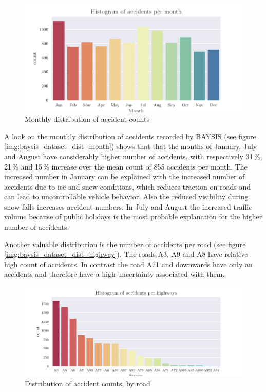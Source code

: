 \begin{figure}[ht]
	\centering
	\includegraphics[scale=0.9]{CorrAnalysis/data/BAYSIS/01_dataset/plots/baysis_dataset_hist_month}
	\caption{Monthly distribution of accident counts}
	\label{img:baysis_dataset_dist_month}
\end{figure}

A look on the monthly distribution of accidents recorded by BAYSIS (see figure \autoref{img:baysis_dataset_dist_month}) shows that that the months of January, July and August have considerably higher number of accidents, with respectively 31\,\%, 21\,\% and 15\,\% increase over the mean count of 855 accidents per month. The increased number in January can be explained with the increased number of accidents due to ice and snow conditions, which reduces traction on roads and can lead to uncontrollable vehicle behavior. Also the reduced visibility during snow falls increases accident numbers. In July and August the increased traffic volume because of public holidays is the most probable explanation for the higher number of accidents. 

Another valuable distribution is the number of accidents per road (see figure \autoref{img:baysis_dataset_dist_highway}). The roads A3, A9 and A8 have relative high count of accidents. In contrast the road A71 and downwards have only an accidents and therefore have a high uncertainty associated with them. 

\clearpage

\begin{figure}[ht]
	\centering
	\includegraphics[scale=0.75]{CorrAnalysis/data/BAYSIS/01_dataset/plots/baysis_dataset_hist_highway}
	\caption{Distribution of accident counts, by road}
	\label{img:baysis_dataset_dist_highway}
	\vspace{-8mm}
\end{figure}

